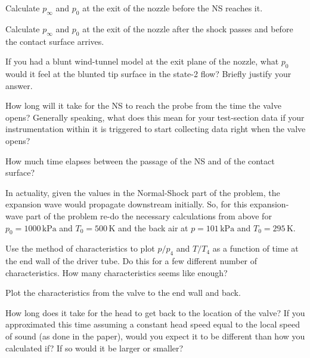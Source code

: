 \documentclass[../main.tex]{subfiles}
\begin{document}


Calculate \(p_\infty\) and \(p_0\) at the exit of the nozzle before the NS reaches it.


Calculate \(p_\infty\) and \(p_0\) at the exit of the nozzle after the shock passes and before the contact surface arrives.


If you had a blunt wind-tunnel model at the exit plane of the nozzle, what \(p_0\) would it feel at the blunted tip surface in the state-2 flow?
Briefly justify your answer.


How long will it take for the NS to reach the probe from the time the valve opens?
Generally speaking, what does this mean for your test-section data if your instrumentation within it is triggered to start collecting data right when the valve opens?


How much time elapses between the passage of the NS and of the contact surface?


In actuality, given the values in the Normal-Shock part of the problem, the expansion wave would propagate downstream initially.
So, for this expansion-wave part of the problem re-do the necessary calculations from above for \(p_0 = 1000 \, \unit{\kilo\pascal}\) and \(T_0 = 500\,\unit{\kelvin}\) and the back air at \(p=101\,\unit{\kilo\pascal}\) and \(T_0 = 295\,\unit{\kelvin}\). 


Use the method of characteristics to plot \(p/p_4\) and \(T/T_4\) as a function of time at the end wall of the driver tube.
Do this for a few different number of characteristics.
How many characteristics seems like enough?


Plot the characteristics from the valve to the end wall and back.


How long does it take for the head to get back to the location of the valve? 
If you approximated this time assuming a constant head speed equal to the local speed of sound (as done in the paper), would you expect it to be different than how you calculated if? 
If so would it be larger or smaller?
\end{document}
